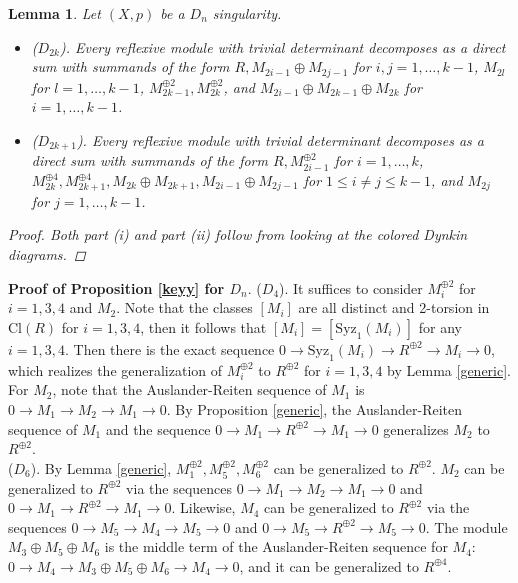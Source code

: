 \documentclass{amsart}[12pt]
\newtheorem{lemma}[theorem]{Lemma}
\theoremstyle{definition}
\theoremstyle{remark}
\numberwithin{equation}{section}
\begin{document}
\begin{lemma} Let $(X, p)$ be a $D_n$ singularity.
\begin{itemize}
\item[(i)] ($D_{2k}$). Every reflexive module with trivial determinant decomposes as a direct sum with summands of the form $R, M_{2i - 1} \oplus M_{2j - 1}$ for $i, j = 1, \dots, k - 1$,  $M_{2l}$ for $l = 1, \dots, k - 1$, $M_{2k - 1}^{\oplus 2}, M_{2k}^{\oplus 2}$, and $M_{2i - 1} \oplus M_{2k - 1} \oplus M_{2k}$ for $i = 1, \dots, k - 1$.
\item[(ii)] ($D_{2k + 1}$). Every reflexive module with trivial determinant decomposes as a direct sum with summands of the form $R, M_{2i - 1}^{\oplus 2}$ for $i = 1, \dots, k$, $M_{2k}^{\oplus 4}, M_{2k + 1}^{\oplus 4}, M_{2k} \oplus M_{2k + 1}, M_{2i - 1} \oplus M_{2j - 1}$ for $1 \leq i \neq j \leq k - 1$, and $M_{2j}$ for $j = 1, \dots, k - 1$.
\end{itemize}
\begin{proof}
Both part (i) and part (ii) follow from looking at the colored Dynkin diagrams.
\end{proof}
\end{lemma}

\noindent \textbf{Proof of Proposition \ref{keyy} for $D_n$}. 
($D_4$). It suffices to consider $M_i^{\oplus 2}$ for $i = 1, 3, 4$ and $M_2$. Note that the classes $[M_i]$ are all distinct and 2-torsion in $\mathrm{Cl}(R)$ for $i = 1, 3, 4$, then it follows that $[M_i] = [\mathrm{Syz}_1(M_i)]$ for any $i = 1, 3, 4$. Then there is the exact sequence $0 \to \mathrm{Syz}_1(M_i) \to R^{\oplus 2} \to M_i \to 0$, which realizes the generalization of $M_i^{\oplus 2}$ to $R^{\oplus 2}$ for $i = 1, 3, 4$ by Lemma \ref{generic}. For $M_2$, note that the Auslander-Reiten sequence of $M_1$ is $0 \to M_1 \to M_2 \to M_1 \to 0$. By Proposition \ref{generic}, the Auslander-Reiten sequence of $M_1$ and the sequence $0 \to M_1 \to R^{\oplus 2} \to M_1 \to 0$ generalizes $M_2$ to $R^{\oplus 2}$.
\\

($D_6$). By Lemma \ref{generic}, $M_1^{\oplus 2}, M_5^{\oplus 2}, M_6^{\oplus 2}$ can be generalized to $R^{\oplus 2}$. $M_2$ can be generalized to $R^{\oplus 2}$ via the sequences $0 \to M_1 \to M_2 \to M_1 \to 0$ and $0 \to M_1 \to R^{\oplus 2} \to M_1 \to 0$. Likewise, $M_4$ can be generalized to $R^{\oplus 2}$ via the sequences $0 \to M_5 \to M_4 \to M_5 \to 0$ and $0 \to M_5 \to R^{\oplus 2} \to M_5 \to 0$. The module $M_3 \oplus M_5 \oplus M_6$ is the middle term of the Auslander-Reiten sequence for $M_4$: $0 \to M_4 \to M_3 \oplus M_5 \oplus M_6 \to M_4 \to 0$, and it can be generalized to $R^{\oplus 4}$. 
\end{document}
